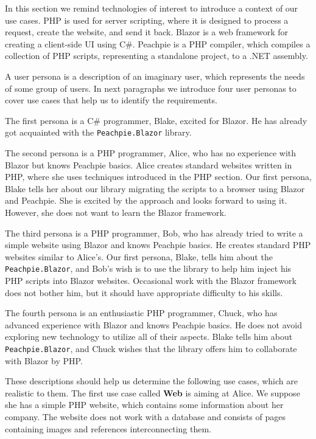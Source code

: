 In this section we remind technologies of interest to introduce a context of our use cases.
PHP is used for server scripting, where it is designed to process a request, create the website, and send it back.
Blazor is a web framework for creating a client-side UI using C\#.
Peachpie is a PHP compiler, which compiles a collection of PHP scripts, representing a standalone project, to a .NET assembly.
\par
A user persona \cite{online:persona} is a description of an imaginary user, which represents the needs of some group of users.
In next paragraphs we introduce four user personas to cover use cases that help us to identify the requirements.
\par
The first persona is a C\# programmer, Blake, excited for Blazor.
He has already got acquainted with the \texttt{Peachpie.Blazor} library.
\par
The second persona is a PHP programmer, Alice, who has no experience with Blazor but knows Peachpie basics.
Alice creates standard websites written in PHP, where she uses techniques introduced in the PHP section.
Our first persona, Blake tells her about our library migrating the scripts to a browser using Blazor and Peachpie.
She is excited by the approach and looks forward to using it.
However, she does not want to learn the Blazor framework.
\par
The third persona is a PHP programmer, Bob, who has already tried to write a simple website using Blazor and knows Peachpie basics.
He creates standard PHP websites similar to Alice's.
Our first persona, Blake, tells him about the \texttt{Peachpie.Blazor}, and Bob's wish is to use the library to help him inject his PHP scripts into Blazor websites.
Occasional work with the Blazor framework does not bother him, but it should have appropriate difficulty to his skills.
\par
The fourth persona is an enthusiastic PHP programmer, Chuck, who has advanced experience with Blazor and knows Peachpie basics.
He does not avoid exploring new technology to utilize all of their aspects.
Blake tells him about \texttt{Peachpie.Blazor}, and Chuck wishes that the library offers him to collaborate with Blazor by PHP.
\par
These descriptions should help us determine the following use cases, which are realistic to them.
The first use case called \textbf{Web} is aiming at Alice.
We suppose she has a simple PHP website, which contains some information about her company.
The website does not work with a database and consists of pages containing images and references interconnecting them.

